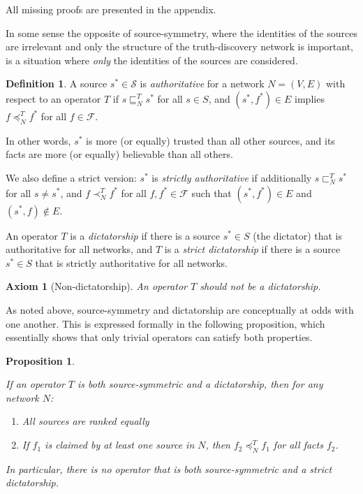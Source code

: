 \documentclass{article}
\theoremstyle{definition} \newtheorem{definition}{Definition}
\theoremstyle{definition} \newtheorem{example}{Example}
\theoremstyle{plain} \newtheorem{axiom}{Axiom}
\theoremstyle{plain} \newtheorem*{remark}{Remark}
\theoremstyle{remark} \newtheorem*{notation}{Notation}
\theoremstyle{plain} \newtheorem{lemma}{Lemma}
\theoremstyle{plain} \newtheorem{theorem}{Theorem}
\theoremstyle{plain} \newtheorem{proposition}{Proposition}
\renewcommand{\S}{\mathcal{S}}  %
\newcommand{\F}{\mathcal{F}}
\newcommand{\sle}{\sqsubseteq}
\newcommand{\slt}{\sqsubset}
\newcommand{\fle}{\preceq}
\newcommand{\flt}{\prec}
\begin{document}
All missing proofs are presented in the appendix.

In some sense the opposite of source-symmetry, where the identities of the
sources are irrelevant and only the structure of the truth-discovery network is
important, is a situation where \emph{only} the identities of the sources are
considered.

\begin{definition}

A source $s^* \in \S$ is \emph{authoritative} for a network $N=(V, E)$ with
respect to an operator $T$ if $s \sle_N^T s^*$ for all $s \in S$, and $(s^*,
f^*) \in E$ implies $f \fle_N^T f^*$ for all $f \in \F$.

In other words, $s^*$ is more (or equally) trusted than all other sources, and
its facts are more (or equally) believable than all others.

We also define a strict version: $s^*$ is \emph{strictly authoritative} if
additionally $s \slt_N^T s^*$ for all $s \ne s^*$, and $f \flt_N^T f^*$ for all
$f, f^* \in \F$ such that $(s^*, f^*) \in E$ and $(s^*, f) \notin E$.

An operator $T$ is a \emph{dictatorship} if there is a source $s^* \in S$ (the
dictator) that is authoritative for all networks, and $T$ is a \emph{strict
dictatorship} if there is a source $s^* \in S$ that is strictly authoritative
for all networks.

\end{definition}

\begin{axiom}[Non-dictatorship]
\label{axiom:non_dict}
An operator $T$ should not be a dictatorship.
\end{axiom}

As noted above, source-symmetry and dictatorship are conceptually at odds with
one another. This is expressed formally in the following proposition, which
essentially shows that only trivial operators can satisfy both properties.

\begin{proposition}
\label{prop:symm_and_dict}

If an operator $T$ is both source-symmetric and a dictatorship, then for any
network $N$:
\begin{enumerate}
\item All sources are ranked equally
\item If $f_1$ is claimed by at least one source in $N$, then $f_2 \fle_N^T
f_1$ for all facts $f_2$.
\end{enumerate}

In particular, there is no operator that is both source-symmetric and a strict
dictatorship.
\end{proposition}
\end{document}
